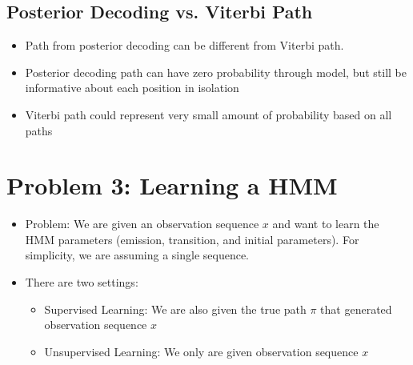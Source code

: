 \documentclass[10pt]{article}
\begin{document}
\subsection*{Posterior Decoding vs. Viterbi Path}
\begin{itemize}
	\item Path from posterior decoding can be different from Viterbi path.
	\item Posterior decoding path can have zero probability through model, but still be informative about each position in isolation
	\item Viterbi path could represent very small amount of probability based on all paths
\end{itemize}

\section*{Problem 3: Learning a HMM}
\begin{itemize}
	\item Problem: We are given an observation sequence $x$ and want to learn the HMM parameters (emission, transition, and initial parameters).  For simplicity, we are assuming a single sequence.
	\item There are two settings:
	\begin{itemize}
        \item Supervised Learning: We are also given the true path $\pi$ that generated observation sequence $x$
        \item Unsupervised Learning: We only are given observation sequence $x$
    \end{itemize}
\end{itemize}
\end{document}
